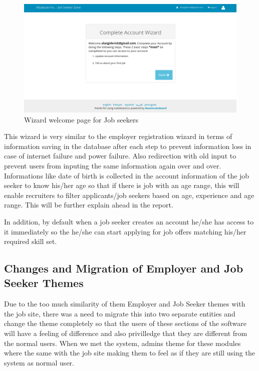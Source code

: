\begin{figure}[h]
\centering
\includegraphics[width=13cm,scale=1.5]{Figures/JobSeekerWizard}
\decoRule
\caption[Job Seeker Wizard]{Wizard welcome page for Job seekers}
\label{fig:Modules}
\end{figure}

This wizard is very similar to the employer registration wizard in terms of information saving in the database after each step to prevent information loss in case of internet failure and power failure. Also redirection with old input to prevent users from inputing the same information again over and over. Informations like date of birth is collected in the account information of the job seeker to know his/her age so that if there is job with an age range, this will enable recruiters to filter applicants/job seekers based on age, experience and age range. This will be further explain ahead in the report.

In addition, by default when a job seeker creates an account he/she has access to it immediately so the he/she can start applying for job offers matching his/her required skill set.

\subsection{Changes and Migration of Employer and Job Seeker Themes}

Due to the too much similarity of them Employer and Job Seeker themes with the job site, there was a need to migrate this into two separate entities and change the theme completely so that the users of these sections of the software will have a feeling of difference and also privilledge that they are different from the normal users. When we met the system, admins theme for these modules where the same with the job site making them to feel as if they are still using the system as normal user. \\

